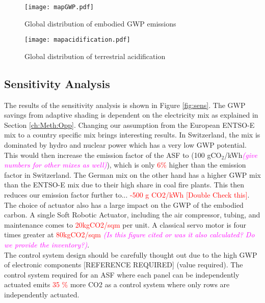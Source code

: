 \begin{figure}[H]
\begin{center}
\texttt{[image: mapGWP.pdf]}
\caption{Global distribution of embodied GWP emissions}
\label{fig:mapGWP}
\end{center}
\end{figure}

\begin{figure}[H]
\begin{center}
\texttt{[image: mapacidification.pdf]}
\caption{Global distribution of terrestrial acidification}
\label{fig:mapAcid}
\end{center}
\end{figure}

\subsection{Sensitivity Analysis}

The results of the sensitivity analysis is shown in Figure \ref{fig:sens}. The GWP savings from adaptive shading is dependent on the electricity mix as explained in Section \ref{ch:Meth:Opp}. Changing our assumption from the European ENTSO-E mix to a country specific mix brings interesting results. In Switzerland, the mix is dominated by hydro and nuclear power which has a very low GWP potential\cite{itten2012life}. This would then increase the emission factor of the ASF to (100 gCO${_2}$/kWh\textcolor{magenta}{\textit{(give numbers for other mixes as well)}}), which is only \textcolor{red}{6\%} higher than the emission factor in Switzerland. The German mix on the other hand has a higher GWP mix than the ENTSO-E mix due to their high share in coal fire plants. This then reduces our emission factor further to... \textcolor{red}{-500 g CO2/kWh} \textcolor{red}{[Double Check this]}.\\

The choice of actuator also has a large impact on the GWP of the embodied carbon. A single Soft Robotic Actuator, including the air compressor, tubing, and maintenance comes to \textcolor{red}{20kgCO2/sqm} per unit. A classical servo motor is four times greater at \textcolor{red}{80kgCO2/sqm} \textcolor{magenta}{\textit{(Is this figure cited or was it also calculated? Do we provide the inventory?)}}.\\

The control system design should be carefully thought out due to the high GWP of electronic components [REFERENCE REQUIRED] (value required). The control system required for an ASF where each panel can be independently actuated emits \textcolor{red}{35 \%} more CO2 as a control system where only rows are independently actuated.\\

